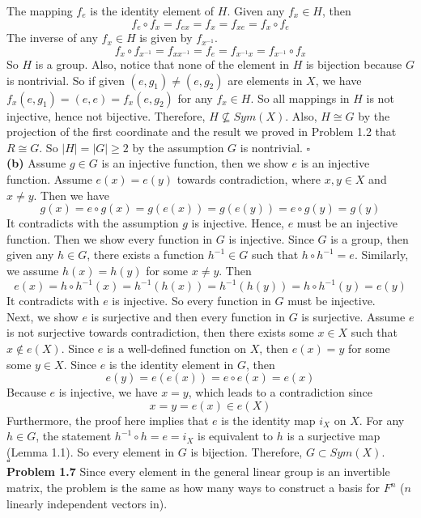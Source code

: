 \documentclass[12pt]{amsart}
\begin{document}
The mapping $f_e$ is the identity element of $H$. Given any $f_x\in H$, then 
\[f_e\circ f_x=f_{ex}=f_{x}=f_{xe}=f_x\circ f_e\]
The inverse of any $f_x\in H$ is given by $f_{x^{-1}}$.
\[f_x\circ f_{x^{-1}}=f_{xx^{-1}}=f_e=f_{x^{-1}x}=f_{x^{-1}}\circ f_x\]
So $H$ is a group. Also, notice that none of the element in $H$ is bijection because $G$ is nontrivial. So if given $(e,g_1)\neq (e,g_2)$ are elements in $X$, we have $f_x(e,g_1)=(e,e)=f_x(e,g_2)$ for any $f_x\in H$. So all mappings in $H$ is not injective, hence not bijective. Therefore, $H\nsubseteq Sym(X)$. Also, $H\cong G$ by the projection of the first coordinate and the result we proved in Problem 1.2 that $R\cong G$. So $|H|=|G|\geq 2$ by the assumption $G$ is nontrivial.
\phantom{qed}\hfill$\square$\\
\textbf{(b)} Assume $g\in G$ is an injective function, then we show $e$ is an injective function. Assume $e(x)=e(y)$ towards contradiction, where $x,y\in X$ and $x\neq y$. Then we have 
$$g(x)=e\circ g(x)=g(e(x))=g(e(y))=e\circ g(y)=g(y)$$
It contradicts with the assumption $g$ is injective. Hence, $e$ must be an injective function. Then we show every function in $G$ is injective. Since $G$ is a group, then given any $h\in G$, there exists a function $h^{-1}\in G$ such that $h\circ h^{-1}=e$. Similarly, we assume $h(x)=h(y)$ for some $x\neq y$. Then 
\[e(x)=h\circ h^{-1}(x)=h^{-1}(h(x))=h^{-1}(h(y))=h\circ h^{-1}(y)=e(y)\]
It contradicts with $e$ is injective. So every function in $G$ must be injective.\\
Next, we show $e$ is surjective and then every function in $G$ is surjective. Assume $e$ is not surjective towards contradiction, then there exists some $x\in X$ such that $x\notin e(X)$. Since $e$ is a well-defined function on $X$, then $e(x)=y$ for some some $y\in X$. Since $e$ is the identity element in $G$, then 
\[e(y)=e(e(x))=e\circ e(x)=e(x)\]
Because $e$ is injective, we have $x=y$, which leads to a contradiction since $$x=y=e(x)\in e(X)$$
Furthermore, the proof here implies that $e$ is the identity map $i_X$ on $X$. For any $h\in G$, the statement $h^{-1}\circ h=e=i_X$ is equivalent to $h$ is a surjective map (Lemma 1.1). So every element in $G$ is bijection. Therefore, $G\subset Sym(X)$. 
\\\phantom{qed}\hfill$\square$\\
\textbf{Problem 1.7} Since every element in the general linear group is an invertible matrix, the problem is the same as how many ways to construct a basis for $F^n$ ($n$ linearly independent vectors in).\\
\end{document}

